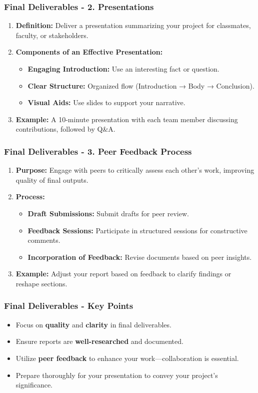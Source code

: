 \documentclass[aspectratio=169]{beamer}
\begin{document}
\begin{frame}[fragile]
    \frametitle{Final Deliverables - 2. Presentations}
    \begin{enumerate}
        \item \textbf{Definition:} Deliver a presentation summarizing your project for classmates, faculty, or stakeholders.
        \item \textbf{Components of an Effective Presentation:}
        \begin{itemize}
            \item \textbf{Engaging Introduction:} Use an interesting fact or question.
            \item \textbf{Clear Structure:} Organized flow (Introduction → Body → Conclusion).
            \item \textbf{Visual Aids:} Use slides to support your narrative.
        \end{itemize}
        \item \textbf{Example:} A 10-minute presentation with each team member discussing contributions, followed by Q\&A.
    \end{enumerate}
\end{frame}

\begin{frame}[fragile]
    \frametitle{Final Deliverables - 3. Peer Feedback Process}
    \begin{enumerate}
        \item \textbf{Purpose:} Engage with peers to critically assess each other's work, improving quality of final outputs.
        \item \textbf{Process:}
        \begin{itemize}
            \item \textbf{Draft Submissions:} Submit drafts for peer review.
            \item \textbf{Feedback Sessions:} Participate in structured sessions for constructive comments.
            \item \textbf{Incorporation of Feedback:} Revise documents based on peer insights.
        \end{itemize}
        \item \textbf{Example:} Adjust your report based on feedback to clarify findings or reshape sections.
    \end{enumerate}
\end{frame}

\begin{frame}[fragile]
    \frametitle{Final Deliverables - Key Points}
    \begin{itemize}
        \item Focus on \textbf{quality} and \textbf{clarity} in final deliverables.
        \item Ensure reports are \textbf{well-researched} and documented.
        \item Utilize \textbf{peer feedback} to enhance your work—collaboration is essential.
        \item Prepare thoroughly for your presentation to convey your project's significance.
    \end{itemize}
\end{frame}
\end{document}
